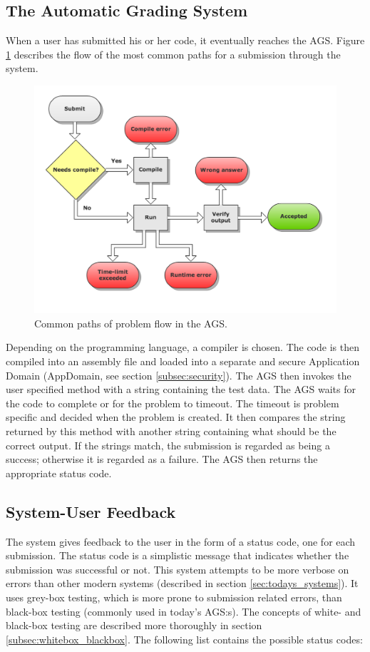 \subsection{The Automatic Grading System}
When a user has submitted his or her code, it eventually reaches the AGS. Figure \ref{fig:flowchart} describes the flow of the most common paths for a submission through the system.

\begin{figure}[h]
	\centering
	\includegraphics[width=0.8\linewidth]{chapters/media/flowchart.png}
	\caption{Common paths of problem flow in the AGS.}
	\label{fig:flowchart}
\end{figure}

Depending on the programming language, a compiler is chosen. The code is then compiled into an assembly file and loaded into a separate and secure Application Domain (AppDomain, see section \ref{subsec:security}). The AGS then invokes the user specified method with a string containing the test data. The AGS waits for the code to complete or for the problem to timeout. The timeout is problem specific and decided when the problem is created. It then compares the string returned by this method with another string containing what should be the correct output. If the strings match, the submission is regarded as being a success; otherwise it is regarded as a failure. The AGS then returns the appropriate status code.


\subsection{System-User Feedback} \label{subsec:status_codes}
The system gives feedback to the user in the form of a status code, one for each submission. The status code is a simplistic message that indicates whether the submission was successful or not. This system attempts to be more verbose on errors than other modern systems (described in section \ref{sec:todays_systems}). It uses grey-box testing, which is more prone to submission related errors, than black-box testing (commonly used in today's AGS:s). The concepts of white- and black-box testing are described more thoroughly in section \ref{subsec:whitebox_blackbox}. The following list contains the possible status codes:

